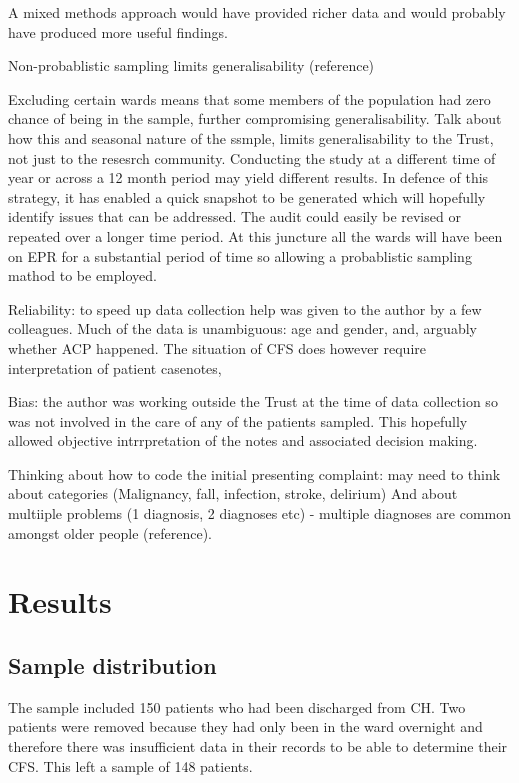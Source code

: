 \documentclass
[
	12pt,
	a4paper,
	oneside,
]{report}
\begin{document}
A mixed methods approach would have provided richer data and would probably
have produced more useful findings.

Non-probablistic sampling limits generalisability (reference)

Excluding certain wards means that some members of the
population had zero chance of being in the sample,
further compromising generalisability. Talk about how this
and seasonal nature of the ssmple, limits generalisability
to the Trust, not just to the resesrch community.
Conducting the study at a different time of year or across
a 12 month period may yield different results. In defence
of this strategy, it has enabled a quick snapshot to be
generated which will hopefully identify issues that can be
addressed. The audit could easily be revised or repeated 
over a longer time period. At this juncture all the wards 
will have been on EPR for a substantial period of time so
allowing a probablistic sampling mathod to be employed.


Reliability: to speed up data collection help was given to the author by a few
colleagues. Much of the data is unambiguous: age and gender, and, arguably
whether ACP happened. The situation of CFS does however require interpretation
of patient casenotes, 

Bias: the author was working outside the Trust at the time 
of data collection so was not involved in the care of any
of the patients sampled. This hopefully allowed objective
intrrpretation of the notes and associated decision making.

Thinking about how to code the initial presenting complaint: may need to think about
categories (Malignancy, fall, infection, stroke, delirium) And about multiiple problems
(1 diagnosis, 2 diagnoses etc) - multiple diagnoses are 
common amongst older people (reference).

\chapter{Results}

\section{Sample distribution}

The sample included 150 patients who had been discharged from CH. Two patients
were removed because they had only been in the ward overnight and therefore
there was insufficient data in their records to be able to determine their
CFS. This left a sample of 148 patients. 
\end{document}
